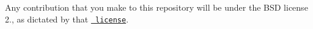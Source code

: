 Any contribution that you make to this repository will be under the BSD license 2., as dictated by that \href{https://opensource.org/licenses/BSD-3-Clause}{\texttt{ license}}. 